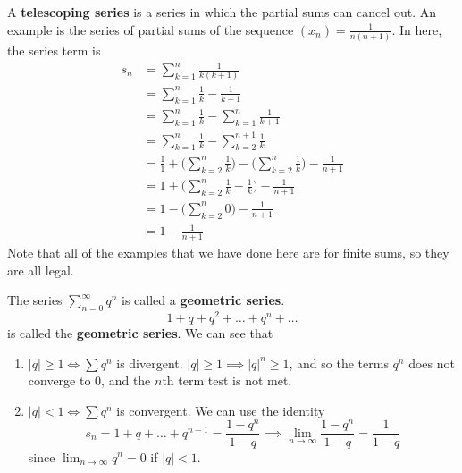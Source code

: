   \begin{example}
    \label{ex:telescoping-series}
    A \textbf{telescoping series} is a series in which the partial sums can cancel out. An example is the series of partial sums of the sequence $(x_n) = \frac{1}{n (n+1)}$. In here, the series term is
    \begin{align}
      s_n & = \sum_{k=1}^n \frac{1}{k(k+1)} \\ 
          & = \sum_{k=1}^n \frac{1}{k} - \frac{1}{k+1} \\
          & = \sum_{k=1}^n \frac{1}{k} - \sum_{k=1}^n \frac{1}{k+1} \\
          & = \sum_{k=1}^n \frac{1}{k} - \sum_{k=2}^{n+1} \frac{1}{k} \\
          & = \frac{1}{1} + \bigg( \sum_{k=2}^n \frac{1}{k} \bigg) - \bigg( \sum_{k=2}^n \frac{1}{k} \bigg) - \frac{1}{n+1} \\
          & = 1 + \bigg( \sum_{k=2}^n \frac{1}{k} - \frac{1}{k} \bigg) - \frac{1}{n+1} \\
          & = 1 - \bigg( \sum_{k=2}^n 0 \bigg) - \frac{1}{n+1} \\
          & = 1 - \frac{1}{n+1} 
    \end{align} 
    Note that all of the examples that we have done here are for finite sums, so they are all legal. 
  \end{example}

  \begin{example}
		\label{ex:geometric_series}
    The series $\sum_{n=0}^\infty q^n$ is called a \textbf{geometric series}. 
    \begin{equation}
      1 + q + q^2 + \ldots + q^n + \ldots
    \end{equation}
    is called the \textbf{geometric series}. We can see that 
    \begin{enumerate}
      \item $|q| \geq 1 \iff \sum q^n$ is divergent. $|q| \geq 1 \implies |q|^n \geq 1$, and so the terms $q^n$ does not converge to $0$, and the $n$th term test is not met. 
      \item $|q| < 1 \iff \sum q^n$ is convergent. We can use the identity 
      \begin{equation}
        s_n = 1 + q + \ldots + q^{n-1} = \frac{1 - q^n}{1-q} \implies \lim_{n \rightarrow \infty} \frac{1 - q^n}{1 - q} = \frac{1}{1 - q}
      \end{equation} 
      since $\lim_{n\rightarrow \infty} q^n = 0$ if $|q|<1$. 
    \end{enumerate}
  \end{example}

